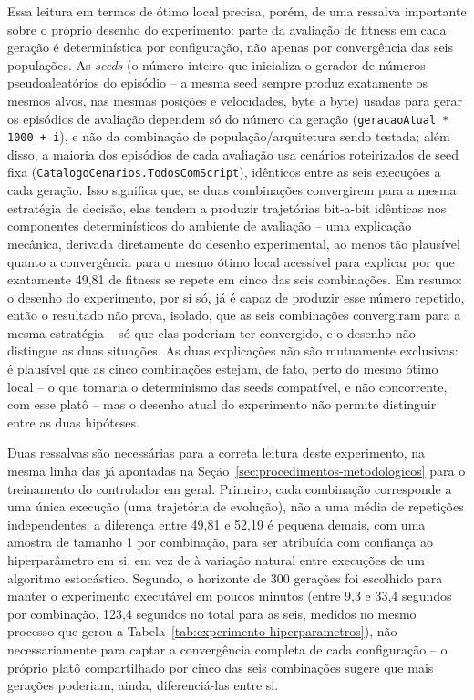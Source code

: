 \documentclass[12pt,a4paper]{article}
\begin{document}
Essa leitura em termos de ótimo local precisa, porém, de uma ressalva importante sobre o próprio
desenho do experimento: parte da avaliação de fitness em cada geração é determinística por
configuração, não apenas por convergência das seis populações. As \textit{seeds} (o número inteiro
que inicializa o gerador de números pseudoaleatórios do episódio -- a mesma seed sempre produz
exatamente os mesmos alvos, nas mesmas posições e velocidades, byte a byte) usadas para gerar os
episódios de avaliação dependem só do número da geração (\texttt{geracaoAtual * 1000 + i}), e não
da combinação de população/arquitetura sendo testada; além disso, a maioria dos episódios de cada
avaliação usa cenários roteirizados de seed fixa (\texttt{CatalogoCenarios.TodosComScript}),
idênticos entre as seis execuções a cada geração. Isso significa que, se duas combinações
convergirem para a mesma estratégia de decisão, elas tendem a produzir trajetórias
bit-a-bit idênticas nos componentes determinísticos do ambiente de avaliação -- uma explicação
mecânica, derivada diretamente do desenho experimental, ao menos tão plausível quanto a
convergência para o mesmo ótimo local acessível para explicar por que exatamente 49,81 de fitness
se repete em cinco das seis combinações. Em resumo: o desenho do experimento, por si só, já é capaz
de produzir esse número repetido, então o resultado não prova, isolado, que as seis combinações
convergiram para a mesma estratégia -- só que elas poderiam ter convergido, e o desenho não distingue
as duas situações. As duas explicações não são mutuamente exclusivas: é
plausível que as cinco combinações estejam, de fato, perto do mesmo ótimo local -- o que tornaria o
determinismo das seeds compatível, e não concorrente, com esse platô -- mas o desenho atual do
experimento não permite distinguir entre as duas hipóteses.

Duas ressalvas são necessárias para a correta leitura deste experimento, na mesma linha das já
apontadas na Seção~\ref{sec:procedimentos-metodologicos} para o treinamento do controlador em geral.
Primeiro, cada combinação corresponde a uma única execução (uma trajetória de evolução), não a uma
média de repetições independentes; a diferença entre 49,81 e 52,19 é pequena demais, com uma amostra
de tamanho 1 por combinação, para ser atribuída com confiança ao hiperparâmetro em si, em vez de à
variação natural entre execuções de um algoritmo estocástico. Segundo, o horizonte de 300 gerações foi
escolhido para manter o experimento executável em poucos minutos (entre 9,3 e 33,4 segundos por
combinação, 123,4 segundos no total para as seis, medidos no mesmo processo que gerou a
Tabela~\ref{tab:experimento-hiperparametros}), não necessariamente para captar a convergência completa
de cada configuração -- o próprio platô compartilhado por cinco das seis combinações sugere que mais
gerações poderiam, ainda, diferenciá-las entre si.
\end{document}
